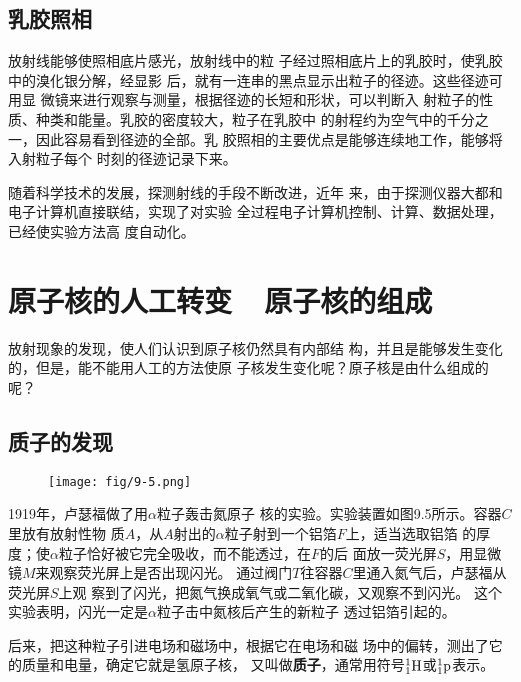 \subsection{乳胶照相}

放射线能够使照相底片感光，放射线中的粒
子经过照相底片上的乳胶时，使乳胶中的溴化银分解，经显影
后，就有一连串的黑点显示出粒子的径迹。这些径迹可用显
微镜来进行观察与测量，根据径迹的长短和形状，可以判断入
射粒子的性质、种类和能量。乳胶的密度较大，粒子在乳胶中
的射程约为空气中的千分之一，因此容易看到径迹的全部。乳
胶照相的主要优点是能够连续地工作，能够将入射粒子每个
时刻的径迹记录下来。

随着科学技术的发展，探测射线的手段不断改进，近年
来，由于探测仪器大都和电子计算机直接联结，实现了对实验
全过程电子计算机控制、计算、数据处理，已经使实验方法高
度自动化。

\section{原子核的人工转变~~原子核的组成}
放射现象的发现，使人们认识到原子核仍然具有内部结
构，并且是能够发生变化的，但是，能不能用人工的方法使原
子核发生变化呢？原子核是由什么组成的呢？

\subsection{质子的发现}
\begin{figure}[htp]\centering
\texttt{[image: fig/9-5.png]}
\caption{}
\end{figure}

1919年，卢瑟福做了用$\alpha$粒子轰击氮原子
核的实验。实验装置如图9.5所示。容器$C$里放有放射性物
质$A$，从$A$射出的$\alpha$粒子射到一个铝箔$F$上，适当选取铝箔
的厚度；使$\alpha$粒子恰好被它完全吸收，而不能透过，在$F$的后
面放一荧光屏$S$，用显微镜$M$来观察荧光屏上是否出现闪光。
通过阀门$T$往容器$C$里通入氮气后，卢瑟福从荧光屏$S$上观
察到了闪光，把氮气换成氧气或二氧化碳，又观察不到闪光。
这个实验表明，闪光一定是$\alpha$粒子击中氮核后产生的新粒子
透过铝箔引起的。

后来，把这种粒子引进电场和磁场中，根据它在电场和磁
场中的偏转，测出了它的质量和电量，确定它就是氢原子核，
又叫做\textbf{质子}，通常用符号$\atom{H}{1}{1}$或$\atom{p}{1}{1}$表示。
\begin{figure}[htp]\centering
{}\qquad\qquad {}
\caption{}
\end{figure}

